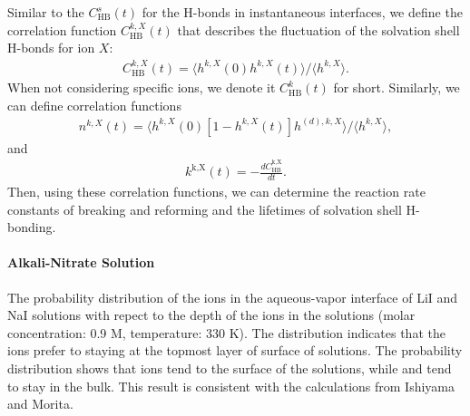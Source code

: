 Similar to the $C^s_\text{HB}(t)$ for the H-bonds in instantaneous interfaces,
we define the correlation function $C^{k,X}_\text{HB}(t)$ that describes the fluctuation of the solvation shell H-bonds for ion $X$: 
\begin{eqnarray}
C^{k,X}_{\text{HB}}(t)=\langle h^{k,X}(0)h^{k,X}(t) \rangle/\langle h^{k,X}\rangle
\label{eq:C_k_HB}.
\end{eqnarray}
When not considering specific ions, we denote it $C^{k}_\text{HB}(t)$ for short.
%
Similarly, we can define correlation functions 
\begin{eqnarray}
n^{k,X}(t)=\langle h^{k,X}(0)[1-h^{k,X}(t)]h^{(d),k,X} \rangle/\langle h^{k,X}\rangle
\label{eq:n_k_HB},
\end{eqnarray}
and 
\begin{eqnarray}
k^\text{k,X}(t)= -\frac{dC_\text{HB}^\text{k,X}}{dt}
\label{eq:k_k_HB}.
\end{eqnarray}
Then, using these correlation functions, we can determine the reaction rate constants of breaking and reforming and the lifetimes of solvation shell H-bonding.
%
\paragraph{Alkali-Nitrate Solution}
The probability distribution of the ions in the aqueous-vapor interface of  LiI and NaI solutions with repect to the depth of the ions in the solutions (molar concentration: 0.9 M, temperature: 330 K). The distribution indicates that the \I ions prefer to staying at the topmost layer of surface of solutions.
 The probability distribution shows that \I ions tend to the surface of the solutions, while \Na and \Li tend to stay in the bulk. This result is consistent with the calculations from Ishiyama and Morita\cite{TI07,TI14}.

